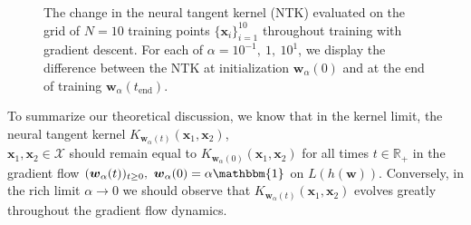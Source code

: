 \documentclass{article}
\begin{document}
\begin{figure}[H]
\centering
{}\hfill
{}\par 
{}
\caption{The change in the neural tangent kernel (NTK) evaluated on the grid of $N= 10$ training points $\{ \boldsymbol{x}_i \}_{i=1}^{10}$ throughout training with gradient descent. For each of $\alpha = 10^{-1}, \ 1, \ 10^{1}$, we display the difference between the NTK at initialization $\boldsymbol{w}_{\alpha}(0)$ and at the end of training $\boldsymbol{w}_{\alpha}(t_{\text{end}})$.}\label{img:ntkchange}
\end{figure}

To summarize our theoretical discussion, we know that in the kernel limit, the neural tangent kernel $K_{\boldsymbol{w}_{\alpha}(t)}(\boldsymbol{x}_1, \boldsymbol{x}_2)$,\\ $\boldsymbol{x}_1, \boldsymbol{x}_2 \in \mathcal{X}$ should remain equal to $K_{\boldsymbol{w}_{\alpha}(0)}(\boldsymbol{x}_1, \boldsymbol{x}_2)$ for all times $t \in \mathbb{R}_+$ in the gradient flow $(\boldsymbol{w}_{\alpha}(t))_{t \geq 0}, \ \boldsymbol{w}_{\alpha}(0) = \alpha \mathbbm{1}$ on $L(h(\boldsymbol{w}))$. Conversely, in the rich limit $\alpha \rightarrow 0$ we should observe that $K_{\boldsymbol{w}_{\alpha}(t)}(\boldsymbol{x}_1, \boldsymbol{x}_2)$ evolves greatly throughout the gradient flow dynamics.
\end{document}
